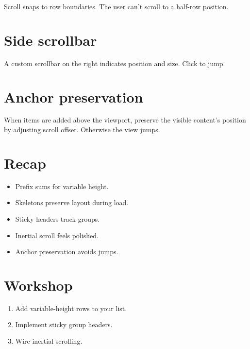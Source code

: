 Scroll snaps to row boundaries. The user can't scroll to a
half-row position.

\section{Side scrollbar}

A custom scrollbar on the right indicates position and
size. Click to jump.

\section{Anchor preservation}

When items are added above the viewport, preserve the
visible content's position by adjusting scroll offset.
Otherwise the view jumps.

\section{Recap}

\begin{recap}
\begin{itemize}[leftmargin=*]
  \item Prefix sums for variable height.
  \item Skeletons preserve layout during load.
  \item Sticky headers track groups.
  \item Inertial scroll feels polished.
  \item Anchor preservation avoids jumps.
\end{itemize}
\end{recap}

\section*{Workshop}

\begin{enumerate}[leftmargin=*]
  \item Add variable-height rows to your list.
  \item Implement sticky group headers.
  \item Wire inertial scrolling.
\end{enumerate}
